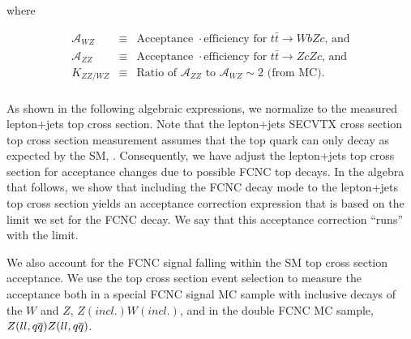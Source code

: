 where

\begin{eqnarray*}
{\mathcal A}_{WZ} & \equiv & \textrm{Acceptance } \cdot \textrm{
efficiency for } t \bar{t} \rightarrow WbZc \textrm{, and} \\
{\mathcal A}_{ZZ} & \equiv & \textrm{Acceptance } \cdot \textrm{
efficiency for } t \bar{t} \rightarrow ZcZc \textrm{, and} \\
K_{ZZ/WZ} & \equiv & \textrm {Ratio of } {\mathcal A}_{ZZ} \textrm{ to }
{\mathcal A}_{WZ} \sim 2 \textrm{ (from MC)}.\\
\end{eqnarray*}

As shown in the following algebraic expressions, we normalize
to the measured lepton+jets top cross section. Note that the lepton+jets
SECVTX cross section top cross section measurement assumes that the 
top quark can only decay as expected by the SM, \tWb. Consequently, 
we have adjust the lepton+jets top cross section for acceptance 
changes due to possible FCNC top decays. In the algebra that follows, we
show that including the FCNC decay mode to the lepton+jets top
cross section yields an acceptance correction expression that 
is based on the limit we set for the FCNC decay. 
We say that this acceptance correction ``runs'' with the \tZq limit.

We also account for the FCNC signal falling within the SM top cross section
acceptance. We use the top cross section event selection to measure the 
acceptance both in a special FCNC signal MC sample with inclusive decays of 
the $W$ and $Z$, $Z(incl.)W(incl.)$, and in the double FCNC MC sample,
$Z(ll,{q\overline{q}})Z(ll,{q\overline{q}})$.



  
